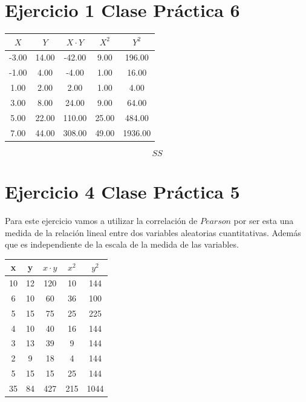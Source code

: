 \documentclass{article}
\begin{document}
	\section*{Ejercicio 1 Clase Pr\'actica 6 }
	
	\begin{table}[ht]
		\centering		
		\begin{tabular}{|ccccc|}
			\hline
			\rowcolor[gray]{0.8} $X$ & $Y$ & $X\cdot Y$ & $X^2$ & $Y^2$ \\ 
			\hline
			-3.00 & 14.00 & -42.00 & 9.00 & 196.00 \\ 
			-1.00 & 4.00 & -4.00 & 1.00 & 16.00 \\ 
			1.00 & 2.00 & 2.00 & 1.00 & 4.00 \\ 
			3.00 & 8.00 & 24.00 & 9.00 & 64.00 \\ 
			5.00 & 22.00 & 110.00 & 25.00 & 484.00 \\ 
			\hline
			\rowcolor[gray]{0.9} 7.00 & 44.00 & 308.00 & 49.00 & 1936.00 \\ 
			\hline
		\end{tabular}
	\end{table}
	
	
	\begin{equation*}
		SS
	\end{equation*}

	\section*{Ejercicio 4 Clase Pr\'actica 5}
		\begin{flushleft}
			Para este ejercicio vamos a utilizar la correlaci\'on de $Pearson$ por ser esta una medida de la relaci\'on lineal entre dos variables aleatorias cuantitativas. Adem\'as que es independiente de la escala de la medida de las variables.
		\end{flushleft}

		\begin{table}[H]
		\centering
		\begin{tabular}{|c|c|c|c|c|}
			\hline
			x & y & $x\cdot y$ & $x^2$ & $y^2$ \\
			\hline
			10 & 12 & 120 & 10 & 144 \\
			\hline
			6 & 10 & 60 & 36 & 100 \\
			\hline
			5 & 15 & 75 & 25 & 225 \\
			\hline
			4 & 10 & 40 & 16 & 144 \\
			\hline
			3 & 13 & 39 & 9 & 144 \\
			\hline
			2 & 9 & 18 & 4 & 144 \\
			\hline
			5 & 15 & 15 & 25 & 144 \\
			\hline
			35 & 84 & 427 & 215 & 1044 \\
			\hline
		\end{tabular}
		\end{table}
\end{document}
